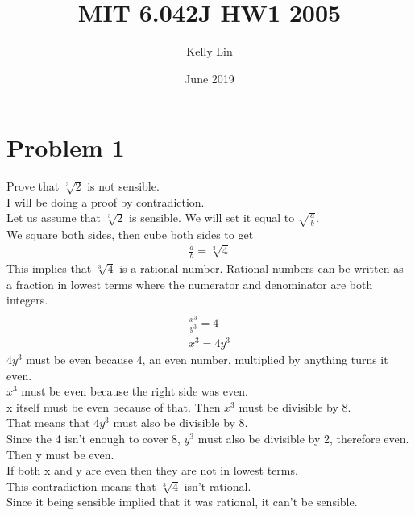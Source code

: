 \documentclass{article}
\title{MIT 6.042J HW1 2005}
\author{Kelly Lin }
\date{June 2019}
\begin{document}
\maketitle

\section{Problem 1}

Prove that $\sqrt[3]{2}$ is not sensible. 
\\
I will be doing a proof by contradiction. 
\\
Let us assume that $\sqrt[3]{2}$ is sensible. We will set it equal to $\sqrt{\frac{a}{b}}$.
\\
We square both sides, then cube both sides to get
\begin {align*}
\frac{a}{b} = \sqrt[3]{4}
\end {align*}
This implies that $\sqrt[3]{4}$ is a rational number. Rational numbers can be written as a fraction in lowest terms where the numerator and denominator are both integers. 
\begin {align*}
\\
\frac{x^{3}}{y^{3}} = 4
\\
x^{3} = 4y^{3}
\end {align*}
$4y^{3}$ must be even because 4, an even number, multiplied by anything turns it even.
\\
$x^{3}$ must be even because the right side was even. 
\\
x itself must be even because of that. Then $x^{3}$ must be divisible by 8. 
\\
That means that $4y^{3}$ must also be divisible by 8. 
\\
Since the 4 isn't enough to cover 8, $y^{3}$ must also be divisible by 2, therefore even. 
\\
Then y must be even. 
\\ 
If both x and y are even then they are not in lowest terms. 
\\
This contradiction means that $\sqrt[3]{4}$ isn't rational. 
\\
Since it being sensible implied that it was rational, it can't be sensible. 

\\
\end{document}
